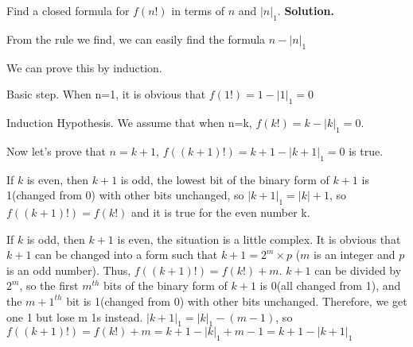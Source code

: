 
\begin{exercise}
   Find a closed formula for $f(n!)$ in terms of $n$ and $|n|_1$.
\textbf{Solution.}
\par From the rule we find, we can easily find the formula $n-|n|_1$
\par We can prove this by induction.
\par Basic step. When n=1, it is obvious that $f(1!)=1-|1|_1=0$
\par Induction Hypothesis. We assume that when n=k, $f(k!)=k-|k|_1=0$.
\par Now let's prove that $n=k+1$, $f((k+1)!)=k+1-|k+1|_1=0$ is true.
\par If $k$ is even, then $k+1$ is odd, the lowest bit of the binary form of $k+1$ is 1(changed from 0) with other bits unchanged, so $|k+1|_1=|k|+1$, so $f((k+1)!)=f(k!)$ and it is true for the even number k.
\par If $k$ is odd, then $k+1$ is even, the situation is a little complex. It is obvious that $k+1$ can be changed into a form such that $k+1=2^m\times p$ ($m$ is an integer and $p$ is an odd number). Thus, $f((k+1)!)=f(k!)+m$. $k+1$ can be divided by $2^m$, so the first $m^{th}$ bits of the binary form of $k+1$ is 0(all changed from 1), and the ${m+1}^{th}$ bit is 1(changed from 0) with other bits unchanged. Therefore, we get one 1 but lose m 1s instead. $|k+1|_1=|k|_1-(m-1)$, so $f((k+1)!)=f(k!)+m=k+1-|k|_1+m-1=k+1-|k+1|_1$
\end{exercise}
